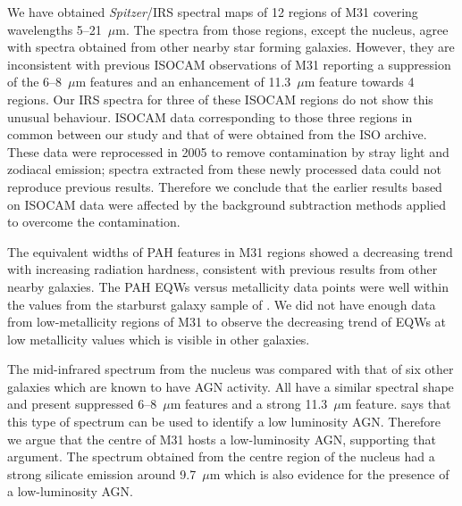 We have obtained {\em Spitzer}/IRS spectral maps of 12 regions of M31 covering wavelengths 5--21~$\mu$m. 
The spectra from those regions, except the nucleus, agree with spectra obtained from other nearby  star forming galaxies. 
However, they are inconsistent with previous ISOCAM observations of M31 \citep{1998Cesarsky} reporting a suppression 
of the 6--8~$\mu$m features and an enhancement of 11.3~$\mu$m feature towards 4 regions. 
Our IRS spectra for three of these ISOCAM regions do not show this unusual behaviour. 
ISOCAM data corresponding to those three regions in common between our study and that of \citep{1998Cesarsky} 
were obtained from the ISO archive. These data were reprocessed in 2005 to remove contamination by stray light and zodiacal emission; 
spectra extracted from these newly processed data could not reproduce previous results. 
Therefore we conclude that the earlier results based on ISOCAM data were affected by the background subtraction methods applied to overcome the contamination.

The equivalent widths of PAH features in M31 regions showed a decreasing trend with increasing radiation hardness, consistent with previous 
results from other nearby galaxies. The PAH EQWs versus metallicity data points were well within the values from the starburst galaxy sample of \citet{Engelbracht_2008}. 
We did not have enough data from low-metallicity regions of M31 to observe the decreasing trend of EQWs at low metallicity values which is visible in other galaxies.

The mid-infrared spectrum from the nucleus was compared with that of six other galaxies which are known to have AGN activity. 
All have a similar spectral shape and present suppressed 6--8~$\mu$m features and a strong 11.3~$\mu$m feature. 
\citealt{Smith:2007lr} says that this type of spectrum can be used to identify a low luminosity AGN. 
Therefore we argue that the centre of M31 hosts a low-luminosity AGN, supporting that argument. %
The spectrum obtained from the centre region of the nucleus had a strong silicate emission around 9.7~$\mu$m which is also evidence for the presence of a low-luminosity AGN.
